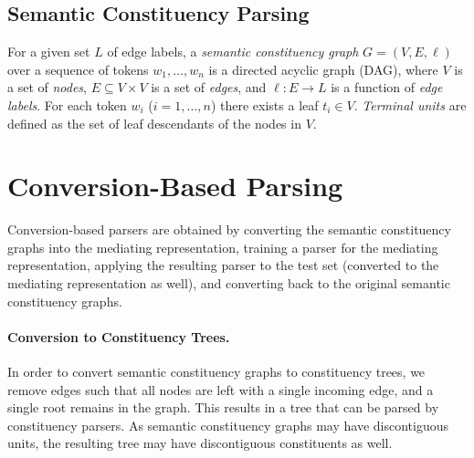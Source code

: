 \documentclass[11pt]{article}
\begin{document}




\subsection{Semantic Constituency Parsing}

For a given set $L$ of edge labels, a \textit{semantic constituency graph} $G=(V,E, \ell)$ over a sequence of tokens $w_1, \ldots, w_n$ is a directed acyclic graph (DAG), where $V$ is a set of \textit{nodes}, $E \subseteq V\times V$ is a set of \textit{edges}, and $\ell:E\to L$ is a function of \textit{edge labels}. For each token $w_i$ ($i=1, \ldots, n$) there exists a leaf  $t_i \in V$. {\it Terminal units} are defined as the set of leaf descendants of the nodes in $V$. 

\section{Conversion-Based Parsing}\label{sec:conversion_approach}

Conversion-based parsers are obtained by converting the semantic constituency graphs into the mediating representation,
training a parser for the mediating representation, applying the resulting parser
to the test set (converted to the mediating representation as well), and converting back
to the original semantic constituency graphs.

\paragraph{Conversion to Constituency Trees.}
In order to convert semantic constituency graphs to constituency trees, we remove edges such that
all nodes are left with a single incoming edge, and a single root remains in the graph.
This results in a tree that can be parsed by constituency parsers.
As semantic constituency graphs may have discontiguous units, the resulting tree may have
discontiguous constituents as well.
\end{document}
